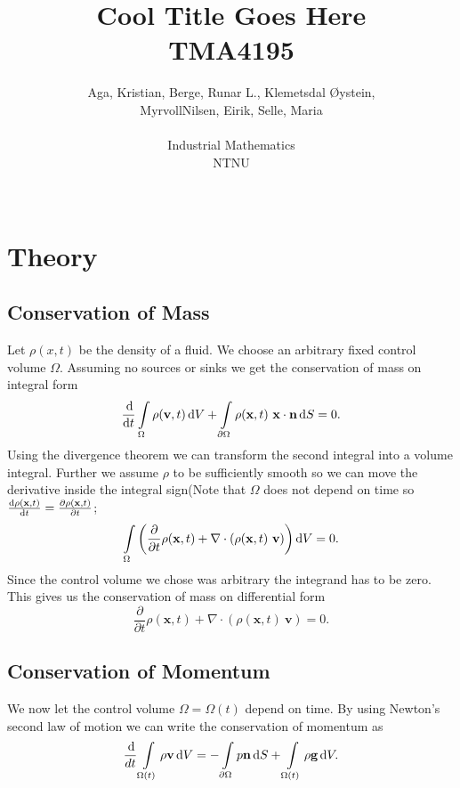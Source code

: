 \documentclass[12pt]{article}
\author{Aga, Kristian, Berge, Runar L., Klemetsdal Øystein,\\
	MyrvollNilsen, Eirik, Selle, Maria\\\\
	Industrial Mathematics\\
	NTNU \\\\
}
\title{Cool Title Goes Here \\     
	TMA4195}
\begin{document}
\maketitle
\clearpage

\section{Theory}
\subsection{Conservation of Mass}
Let $\rho(x,t)$ be the density of a fluid. We choose an arbitrary fixed
control volume
$\Omega$. Assuming no sources or sinks we get the conservation of mass on integral form
\begin{equation}
  \frac{\operatorname{d}\! }{\operatorname{d}\! t}\int\limits_{\Omega}\rho (\mathbf v, t) \operatorname{d}\!
  V + \int\limits_{\partial\Omega} \rho(\mathbf x,
  t)\ \mathbf{x\cdot n} \operatorname{d}\! S = 0.
\end{equation}
Using the divergence theorem we can transform the second integral into
a volume integral. Further we assume $\rho$ to be sufficiently smooth
so we can move the derivative inside the integral sign(Note that
$\Omega$ does not depend on time so $\frac{\operatorname{d}\! \rho(\mathbf x,t)}{\operatorname{d}\!
  t}= \frac{\partial \rho(\mathbf x, t)}{\partial t}$;
\begin{equation*}
  \int\limits_{\Omega}\left(\frac{\partial }{\partial t}\rho (\mathbf x, t) +
    \nabla\cdot(\rho(\mathbf x, t)\ \mathbf v) \right)\operatorname{d}\! V = 0.
\end{equation*}
Since the control volume we chose was arbitrary the integrand has to
be zero. This gives us the conservation of mass on differential form
\begin{equation}
  \frac{\partial }{\partial t}\rho (\mathbf x, t) +
    \nabla\cdot(\rho(\mathbf x, t)\ \mathbf v)  = 0.
\end{equation}
\subsection{Conservation of Momentum}
We now let the control volume $\Omega=\Omega(t)$ depend on time. 
By using Newton's second law of motion we can write the conservation
of momentum as
\begin{equation}
  \frac{\operatorname{d}\! }{d t}\int\limits_{\Omega(t)}\rho \mathbf v \operatorname{d}\! V =
  -\int\limits_{\partial \Omega}p\mathbf n \operatorname{d}\! S +
  \int\limits_{\Omega(t)}\rho\mathbf g\operatorname{d}\! V.
\end{equation}
\end{document}
